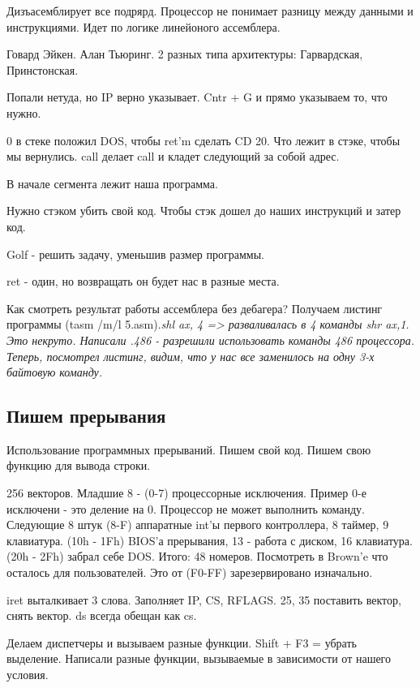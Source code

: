 Дизъасемблирует все подрярд. Процессор не понимает разницу между данными и инструкциями. Идет по логике линейоного ассемблера. 


\begin{rem}Говард Эйкен. Алан Тьюринг. 2 разных типа архитектуры: Гарвардская, Принстонская. \end{rem}


Попали нетуда, но IP верно указывает. Cntr + G и прямо указываем то, что нужно. 

0 в стеке положил DOS, чтобы ret'm сделать CD 20. Что лежит в стэке, чтобы мы вернулись. call делает call и кладет следующий за собой адрес.	

В начале сегмента лежит наша программа.

\begin{hw}Нужно стэком убить свой код. Чтобы стэк дошел до наших инструкций и затер код.\end{hw}

Golf - решить задачу, уменьшив размер программы. 

ret - один, но возвращать он будет нас в разные места.

Как смотреть результат работы ассемблера без дебагера? 	Получаем листинг программы (tasm /m/l 5.asm).\slshape shl ax, 4 \upshape => разваливалась в 4 команды \slshape shr ax,1\upshape. Это некруто. Написали .486 - разрешили использовать команды 486 процессора. Теперь, посмотрел листинг, видим, что у нас все заменилось на одну 3-х байтовую команду.

\subsection{Пишем прерывания}
Использование программных прерываний. Пишем свой код.
Пишем свою функцию для вывода строки.


256 векторов. Младшие 8 - (0-7) процессорные исключения. Пример 0-е исключени - это деление на 0. Процессор не может выполнить команду. Следующие 8 штук (8-F) аппаратные int'ы первого контроллера, 8 таймер, 9 клавиатура. (10h - 1Fh) BIOS'а прерывания, 13 - работа с диском, 16 клавиатура. (20h - 2Fh) забрал себе DOS. Итого: 48 номеров. Посмотреть в Brown'e что осталось для пользователей. Это от (F0-FF) зарезервировано изначально.   

iret выталкивает 3 слова. Заполняет IP, CS, RFLAGS. 25, 35 поставить вектор, снять вектор.
ds всегда обещан как cs.   

Делаем диспетчеры и вызываем разные функции.
Shift + F3 = убрать выделение.
Написали разные функции, вызываемые в зависимости от нашего условия. 

